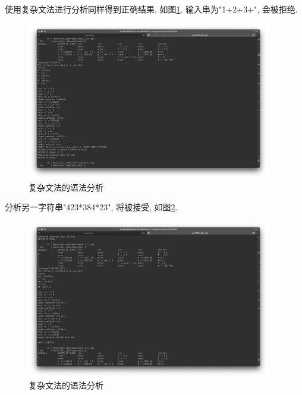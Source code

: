 使用复杂文法进行分析同样得到正确结果, 如图\ref{fig:复杂文法的语法分析}.
输入串为"1+2+3+", 会被拒绝.

\begin{figure}[ht!]
	\begin{center}
		\includegraphics[width=0.95\textwidth]{figures/ll1分析输入20.png}
	\end{center}
	\caption{复杂文法的语法分析}
	\label{fig:复杂文法的语法分析}
\end{figure}

分析另一字符串"423*384*23", 将被接受, 如图\ref{fig:复杂文法的语法分析2}.

\begin{figure}[ht!]
	\begin{center}
		\includegraphics[width=0.95\textwidth]{figures/ll1分析输入21.png}
	\end{center}
	\caption{复杂文法的语法分析}
	\label{fig:复杂文法的语法分析2}
\end{figure}

